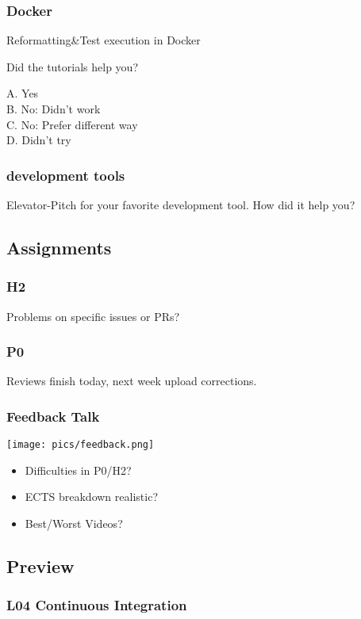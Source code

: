 \begin{frame}
	\frametitle{Docker}

	Reformatting\&Test execution in Docker

	Did the tutorials help you?

	A. Yes \\
	B. No: Didn't work \\
	C. No: Prefer different way \\
	D. Didn't try
\end{frame}

\begin{frame}
	\frametitle{development tools}

	\begin{task}
	Elevator-Pitch for your favorite development tool.
	How did it help you?
	\end{task}
\end{frame}

\breakframe


\subsection{Assignments}

\begin{assignment}
	\frametitle{H2}

	\begin{task}
	Problems on specific issues or PRs?
	\end{task}
\end{assignment}

\begin{assignment}
	\frametitle{P0}

	\begin{task}
	Reviews finish today, next week upload corrections.
	\end{task}
\end{assignment}

\begin{frame}
	\frametitle{Feedback Talk}

	\hfill \texttt{[image: pics/feedback.png]}
	\vspace{-1cm}
	\begin{itemize}
		\item Difficulties in P0/H2?
		\item ECTS breakdown realistic?
		\item Best/Worst Videos?
	\end{itemize}
\end{frame}

\subsection{Preview}

\begin{frame}
	\frametitle{L04 Continuous Integration}
\end{frame}




